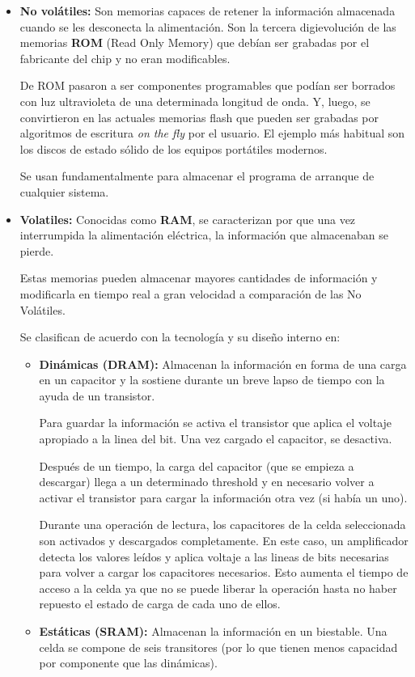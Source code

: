 \begin{itemize}
	\item \textbf{No volátiles:} Son memorias capaces de retener la información almacenada cuando se les desconecta la alimentación. Son la tercera digievolución de las memorias \textbf{ROM} (Read Only Memory) que debían ser grabadas por el fabricante del chip y no eran modificables.
	
	De ROM pasaron a ser componentes programables que podían ser borrados con luz ultravioleta de una determinada longitud de onda. Y, luego, se convirtieron en las actuales memorias flash que pueden ser grabadas por algoritmos de escritura \textit{on the fly} por el usuario. El ejemplo más habitual son los discos de estado sólido de los equipos portátiles modernos.
	
	Se usan fundamentalmente para almacenar el programa de arranque de cualquier sistema.
	
	\item\textbf{Volatiles:} Conocidas como \textbf{RAM}, se caracterizan por que una vez interrumpida la alimentación eléctrica, la información que almacenaban se pierde.
	
	Estas memorias pueden almacenar mayores cantidades de información y modificarla en tiempo real a gran velocidad a comparación de las No Volátiles.
	
	Se clasifican de acuerdo con la tecnología y su diseño interno en:
	
	\begin{itemize}
		\item \textbf{Dinámicas (DRAM):} Almacenan la información en forma de una carga en un capacitor y la sostiene durante un breve lapso de tiempo con la ayuda de un transistor.
		
		Para guardar la información se activa el transistor que aplica el voltaje apropiado a la linea del bit. Una vez cargado el capacitor, se desactiva. 
		
		Después de un tiempo, la carga del capacitor (que se empieza a descargar) llega a un determinado threshold y en necesario volver a activar el transistor para cargar la información otra vez (si había un uno).
		
		Durante una operación de lectura, los capacitores de la celda seleccionada son activados y descargados completamente. En este caso, un amplificador detecta los valores leídos y aplica voltaje a las lineas de bits necesarias para volver a cargar
 		los capacitores necesarios. Esto aumenta el tiempo de acceso a la celda ya que no se puede liberar la operación hasta no haber repuesto el estado de carga de cada uno de ellos.
 		\item \textbf{Estáticas (SRAM):} Almacenan la información en un biestable. Una celda se compone de seis transitores (por lo que tienen menos capacidad por componente que las dinámicas).
 		

\end{itemize}
\end{itemize}
